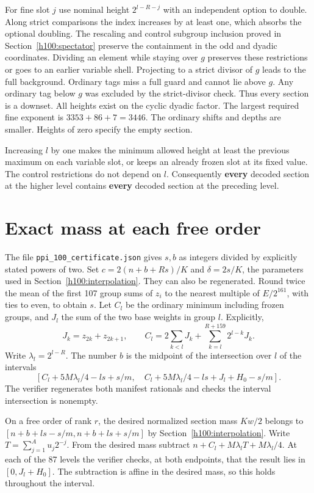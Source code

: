 For fine slot \(j\) use nominal height \(2^{l-R-j}\) with an independent option to double. Along strict comparisons the index increases by at least one, which absorbs the optional doubling. The rescaling and control subgroup inclusion proved in Section~\ref{h100:spectator} preserve the containment in the odd and dyadic coordinates. Dividing an element while staying over \(g\) preserves these restrictions or goes to an earlier variable shell. Projecting to a strict divisor of \(g\) leads to the full background. Ordinary tags miss a full guard and cannot lie above \(g\). Any ordinary tag below \(g\) was excluded by the strict-divisor check. Thus every section is a downset. All heights exist on the cyclic dyadic factor. The largest required fine exponent is \(3353+86+7=3446\). The ordinary shifts and depths are smaller. Heights of zero specify the empty section.

Increasing \(l\) by one makes the minimum allowed height at least the previous maximum on each variable slot, or keeps an already frozen slot at its fixed value. The control restrictions do not depend on \(l\). Consequently \textbf{every} decoded section at the higher level contains \textbf{every} decoded section at the preceding level.

\section{Exact mass at each free order}\label{h100:mass}

The file \texttt{ppi\_100\_certificate.json} gives \(s,b\) as integers divided by explicitly stated powers of two. Set \(c=2(n+b+Rs)/K\) and \(\delta=2s/K\), the parameters used in Section~\ref{h100:interpolation}. They can also be regenerated. Round twice the mean of the first 107 group sums of \(z_i\) to the nearest multiple of \(E/2^{161}\), with ties to even, to obtain \(s\). Let \(C_l\) be the ordinary minimum including frozen groups, and \(J_l\) the sum of the two base weights in group \(l\). Explicitly,
\[
 J_k=z_{2k}+z_{2k+1},\qquad
 C_l=2\sum_{k<l}J_k+\sum_{k=l}^{R+159}2^{l-k}J_k.
\]
Write \(\lambda_l=2^{l-R}\). The number \(b\) is the midpoint of the intersection over \(l\) of the intervals \[
 \left[C_l+5M\lambda_l/4-ls+s/m,\quad
       C_l+5M\lambda_l/4-ls+J_l+H_0-s/m\right].
\] The verifier regenerates both manifest rationals and checks the interval intersection is nonempty.

On a free order of rank \(r\), the desired normalized section mass \(Kw/2\) belongs to \([n+b+ls-s/m,n+b+ls+s/m]\) by Section~\ref{h100:interpolation}. Write \(T=\sum_{j=1}^A u_j2^{-j}\). From the desired mass subtract \(n+C_l+M\lambda_l T+M\lambda_l/4\). At each of the 87 levels the verifier checks, at both endpoints, that the result lies in \([0,J_l+H_0]\). The subtraction is affine in the desired mass, so this holds throughout the interval.

